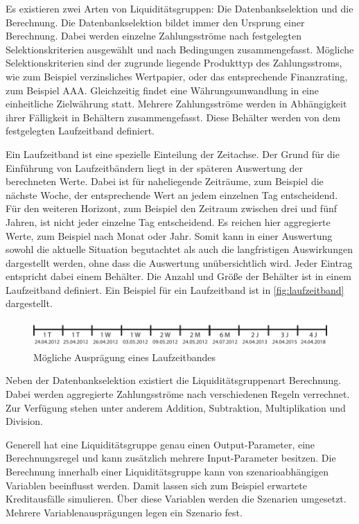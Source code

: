 \begin{onehalfspacing}
Es existieren zwei Arten von Liquiditätsgruppen: Die Datenbankselektion und die Berechnung. Die Datenbankselektion bildet immer den Ursprung einer Berechnung. Dabei werden einzelne Zahlungsströme nach festgelegten Selektionskriterien ausgewählt und nach Bedingungen zusammengefasst. Mögliche Selektionskriterien sind der zugrunde liegende Produkttyp des Zahlungsstroms, wie zum Beispiel verzinsliches Wertpapier, oder das entsprechende Finanzrating, zum Beispiel AAA. Gleichzeitig findet eine Währungsumwandlung in eine einheitliche Zielwährung statt. Mehrere Zahlungsströme werden in Abhängigkeit ihrer Fälligkeit in Behältern zusammengefasst. Diese Behälter werden von dem festgelegten Laufzeitband definiert.

Ein Laufzeitband ist eine spezielle Einteilung der Zeitachse. Der Grund für die Einführung von Laufzeitbändern liegt in der späteren Auswertung der berechneten Werte. Dabei ist für naheliegende Zeiträume, zum Beispiel die nächste Woche, der entsprechende Wert an jedem einzelnen Tag entscheidend. Für den weiteren Horizont, zum Beispiel den Zeitraum zwischen drei und fünf Jahren, ist nicht jeder einzelne Tag entscheidend. Es reichen hier aggregierte Werte, zum Beispiel nach Monat oder Jahr. Somit kann in einer Auswertung sowohl die aktuelle Situation begutachtet als auch die langfristigen Auswirkungen dargestellt werden, ohne dass die Auswertung unübersichtlich wird. Jeder Eintrag entspricht dabei einem Behälter. Die Anzahl und Größe der Behälter ist in einem Laufzeitband definiert. Ein Beispiel für ein Laufzeitband ist in \vref{fig:laufzeitband} dargestellt.

\begin{figure}[ht]
\centering
\setlength{\unitlength}{1mm}
\includegraphics[width=15cm]{images/Abbildung4-Laufzeitband.pdf}
\caption{Mögliche Ausprägung eines Laufzeitbandes\label{fig:laufzeitband}}
\end{figure}

Neben der Datenbankselektion existiert die Liquiditätsgruppenart Berechnung. Dabei werden aggregierte Zahlungsströme nach verschiedenen Regeln verrechnet. Zur Verfügung stehen unter anderem Addition, Subtraktion, Multiplikation und Division. 

Generell hat eine Liquiditätsgruppe genau einen Output-Parameter, eine Berechnungsregel und kann zusätzlich mehrere Input-Parameter besitzen. Die Berechnung innerhalb einer Liquiditätsgruppe kann von szenarioabhängigen Variablen beeinflusst werden. Damit lassen sich zum Beispiel erwartete Kreditausfälle simulieren. Über diese Variablen werden die Szenarien umgesetzt. Mehrere Variablenausprägungen legen ein Szenario fest.


\end{onehalfspacing}
